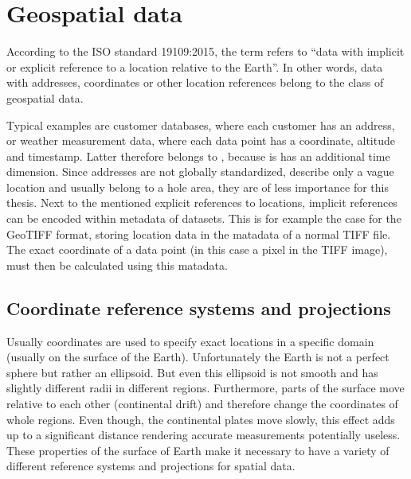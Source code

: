 
\section{Geospatial data}

	According to the ISO standard 19109:2015\cite{geolexica-202}, the term  refers to \enquote{data with implicit or explicit reference to a location relative to the Earth}.
	In other words, data with addresses, coordinates or other location references belong to the class of geospatial data.
	
	Typical examples are customer databases, where each customer has an address, or weather measurement data, where each data point has a coordinate, altitude and timestamp.
	Latter therefore belongs to , because is has an additional time dimension.
	Since addresses are not globally standardized, describe only a vague location and usually belong to a hole area, they are of less importance for this thesis.
	Next to the mentioned explicit references to locations, implicit references can be encoded within metadata of datasets.
	This is for example the case for the GeoTIFF format, storing location data in the matadata of a normal TIFF file\cite{ogc-geotiff}.
	The exact coordinate of a data point (in this case a pixel in the TIFF image), must then be calculated using this matadata.

	\subsection{Coordinate reference systems and projections}
	
		Usually coordinates are used to specify exact locations in a specific domain (usually on the surface of the Earth).
		Unfortunately the Earth is not a perfect sphere but rather an ellipsoid.
		But even this ellipsoid is not smooth and has slightly different radii in different regions.
		Furthermore, parts of the surface move relative to each other (continental drift) and therefore change the coordinates of whole regions.
		Even though, the continental plates move slowly, this effect adds up to a significant distance rendering accurate measurements potentially useless\cite[7]{ordenance-survey-booklet}.
		These properties of the surface of Earth make it necessary to have a variety of different reference systems and projections for spatial data.
		

